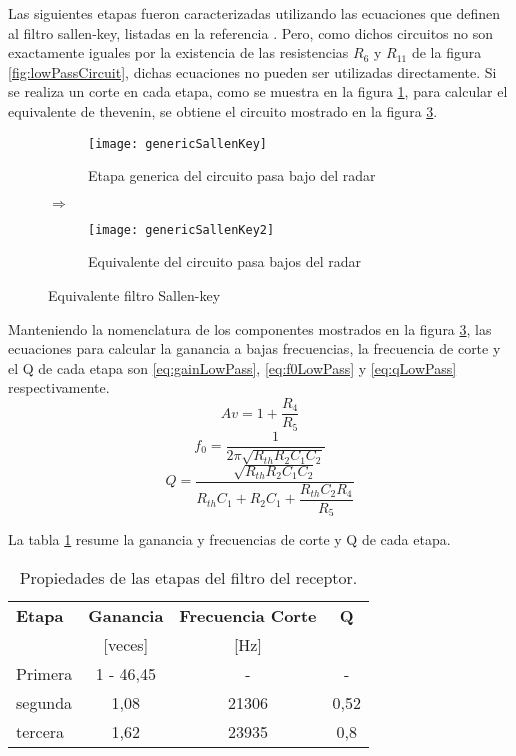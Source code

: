 Las siguientes etapas fueron caracterizadas utilizando las ecuaciones que definen al filtro sallen-key, listadas en la referencia \cite{Unwin2003}. Pero, como dichos circuitos no son exactamente iguales por la existencia de las resistencias $R_6$ y $R_{11}$ de la figura \ref{fig:lowPassCircuit}, dichas ecuaciones no pueden ser utilizadas directamente. Si se realiza un corte en cada etapa, como se muestra en la figura \ref{fig:genericSallen}, para calcular el equivalente de thevenin, se obtiene el circuito mostrado en la figura \ref{fig:genericSallen2}.

\begin{figure}
  \centering
  \begin{subfigure}{0.4\textwidth}
    \texttt{[image: genericSallenKey]}
    \caption{Etapa generica del circuito pasa bajo del radar}
    \label{fig:genericSallen}   
  \end{subfigure}
  {\color{blue}\LARGE$\Rightarrow$}
  \begin{subfigure}{0.4\textwidth}
    \texttt{[image: genericSallenKey2]}
    \caption{Equivalente del circuito pasa bajos del radar}
    \label{fig:genericSallen2}
  \end{subfigure}             
  \caption{Equivalente filtro Sallen-key}
\end{figure}
Manteniendo la nomenclatura de los componentes mostrados en la figura \ref{fig:genericSallen2}, las ecuaciones para calcular la ganancia a bajas frecuencias, la frecuencia de corte y el Q de cada etapa son \ref{eq:gainLowPass}, \ref{eq:f0LowPass} y \ref{eq:qLowPass} respectivamente.
\begin{equation}\label{eq:gainLowPass}
  Av = 1 + \dfrac{R_4}{R_5}
\end{equation}
\begin{equation}\label{eq:f0LowPass}
  f_0 = \dfrac{1}{2\pi\sqrt{R_{th}R_2C_1C_2}}
\end{equation}
\begin{equation}\label{eq:qLowPass}
  Q = \dfrac{\sqrt{R_{th}R_2C_1C_2}}{R_{th}C_1 + R_2C_1 + \dfrac{R_{th}C_2R_4}{R_5}}
\end{equation}

La tabla \ref{tab:lowPassProperties} resume la ganancia y frecuencias de corte y Q de cada etapa.

\begin{table}[htb]
  \caption{Propiedades de las etapas del filtro del receptor.}
  \centering
  \label{tab:lowPassProperties}
  \begin{tabular}{l c c c}
  \toprule
  \textbf{Etapa} & \textbf{Ganancia} & \textbf{Frecuencia Corte} & \textbf{Q} \tabularnewline
   & [veces] & [Hz] & \tabularnewline
  \midrule
  Primera & 1 - 46,45 & - & - \tabularnewline

  segunda & 1,08 & 21306 & 0,52 \tabularnewline

  tercera & 1,62 & 23935 & 0,8 \tabularnewline

  \bottomrule
  \end{tabular}
\end{table}

